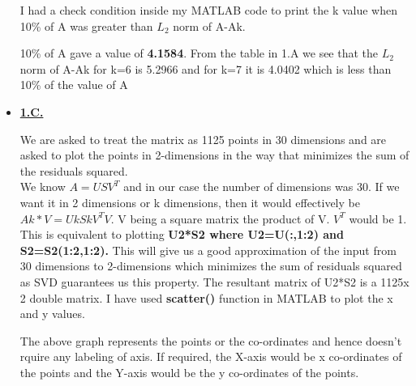 \documentclass[11pt]{article}
\begin{document}
\begin{itemize}
	I had a check condition inside my MATLAB code to print the k value when 10\% of A was greater than $L_2$ norm of A-Ak. 
	
	10\% of A gave a value of \textbf{4.1584}. From the table in 1.A we see that the $L_2$ norm of A-Ak for k=6 is 5.2966 and for k=7 it is 4.0402 which is less than 10\% of the value of A
	
	\item[] \underline{\textbf{1.C.}}
	
	We are asked to treat the matrix as 1125 points in 30 dimensions and are asked to plot the points in 2-dimensions in the way that minimizes the sum of the residuals squared.\\
	
	We know  $A= USV^T$ and in our case the number of dimensions was 30. If we want it in 2 dimensions or k dimensions, then it would effectively be $Ak*V= UkSkV^T V$. V being a square matrix the product of V. $V^T$ would be 1.
	\\
	
	This is equivalent to plotting \textbf{U2*S2  where U2=U(:,1:2) and S2=S2(1:2,1:2).} This will give us a good approximation of the input from 30 dimensions to 2-dimensions which minimizes the sum of residuals squared as SVD guarantees us this property. The resultant matrix of U2*S2 is a 1125x 2 double matrix. I have used \textbf{scatter()} function in MATLAB to plot the x and y values. 

	\begin{figure}[H]%
		\centering
	\end{figure}	

The above graph represents the points or the co-ordinates and hence doesn't rquire any labeling of axis. If required, the X-axis would be x co-ordinates of the points and the Y-axis would be the y co-ordinates of the points.
	
\end{itemize}
\end{document}
